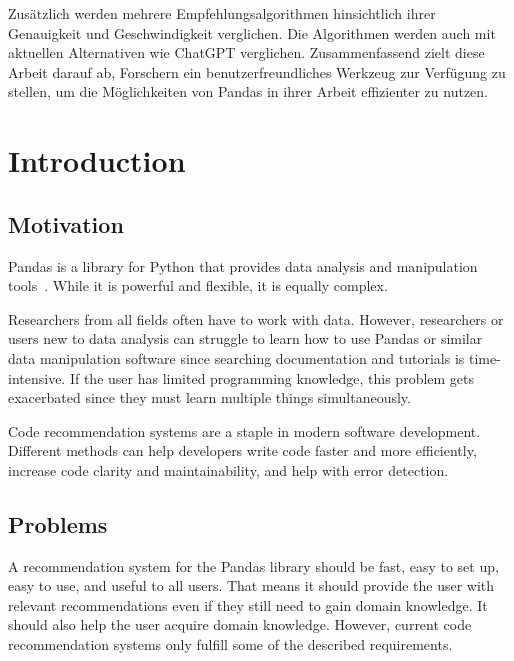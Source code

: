 \documentclass[
     12pt,                    %
     a4paper,             %
     BCOR=10mm,     %
     DIV=14,                 %
     listof=totoc,                    %
     bibliography=totoc,       %
     index=totoc,              %
     twoside,
     headsepline
     ]{scrreprt}
\newcommand{\setlang}[1]{\selectlanguage{#1}\nonfrenchspacing}
\begin{document}
Zusätzlich werden mehrere Empfehlungsalgorithmen hinsichtlich ihrer Genauigkeit und Geschwindigkeit verglichen. Die Algorithmen werden auch mit aktuellen Alternativen wie ChatGPT verglichen. Zusammenfassend zielt diese Arbeit darauf ab, Forschern ein benutzerfreundliches Werkzeug zur Verfügung zu stellen, um die Möglichkeiten von Pandas in ihrer Arbeit effizienter zu nutzen.

\setlang{english}
\tableofcontents
\cleardoublepage
{} 

\listoffigures
\listoftables

\listoflistings
\cleardoublepage


\chapter{Introduction}\label{intro}

\section{Motivation}

Pandas is a library for Python that provides data analysis and manipulation tools~\cite{pandaswebsite}. While it is powerful and flexible, it is equally complex.

Researchers from all fields often have to work with data. However, researchers or users new to data analysis can struggle to learn how to use Pandas or similar data manipulation software since searching documentation and tutorials is time-intensive. If the user has limited programming knowledge, this problem gets exacerbated since they must learn multiple things simultaneously.

Code recommendation systems are a staple in modern software development. Different methods can help developers write code faster and more efficiently, increase code clarity and maintainability, and help with error detection.

\section{Problems}

A recommendation system for the Pandas library should be fast, easy to set up, easy to use, and useful to all users. That means it should provide the user with relevant recommendations even if they still need to gain domain knowledge. It should also help the user acquire domain knowledge. However, current code recommendation systems only fulfill some of the described requirements.
\end{document}

